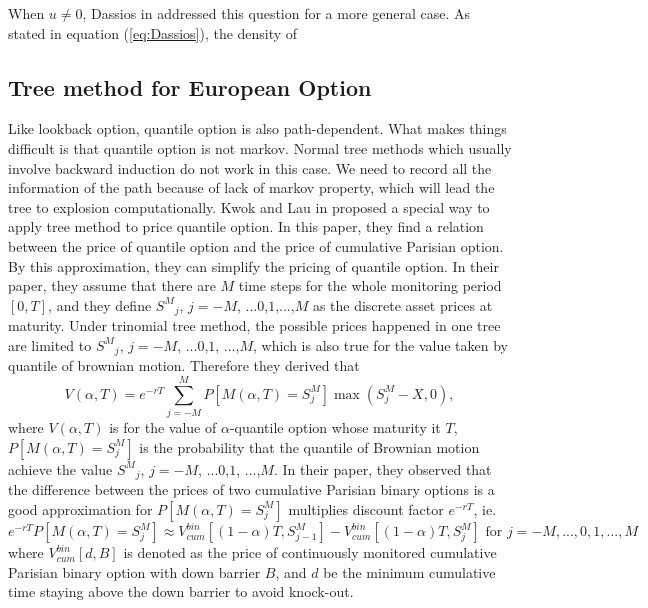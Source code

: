 \documentclass[11pt]{book}
\begin{document}
When $u \neq 0$, Dassios  in \cite{Dassios1995} addressed this question for a more general case.  As stated in equation (\ref{eq:Dassios}), the density of 


\subsection{Tree method for European Option}
Like lookback option, quantile option is also path-dependent. What makes things difficult is that quantile option is not markov. Normal tree methods which usually involve backward induction do not work in this case. We need to record all the information of the path because of lack of markov property, which will lead the tree to explosion computationally. 
Kwok and Lau in \cite{Kwok2001} proposed a special way to apply tree method to price quantile option. In this paper, they find a relation between the price of quantile option and the price of cumulative Parisian option. By this approximation, they can simplify the pricing of quantile option. In their paper, they assume that there are $M$ time steps for the whole monitoring period $[0,T]$, and they define ${S^M}_j$, $j = - M$, ...$0$,$1$,...,$M$ as the discrete asset prices at maturity. Under trinomial tree method, the possible prices happened in one tree are limited to ${S^M}_j$,  $j = - M$, ...$0$,$1$, ...,$M$, which is also true for the value taken by quantile of brownian motion. Therefore they derived that 
\begin{equation}\label{eq:kowk1}
V(\alpha, T) = e^{-rT} \sum^{M}_{j=-M}P[M(\alpha,T)=S^{M}_{j}]\max(S^{M}_{j}-X,0),
\end{equation}
where $V(\alpha,T)$ is for the value of $\alpha$-quantile option whose maturity it $T$, $P[M(\alpha,T)=S^{M}_{j}]$ is the probability that the quantile of Brownian motion achieve the value ${S^M}_j$,  $j = - M$, ...$0$,$1$, ...,$M$. In their paper, they observed that the difference between the prices of two cumulative Parisian binary options is a good approximation for $P[M(\alpha,T)=S^{M}_{j}]$ multiplies discount factor $e^{-rT}$, ie.
\begin{equation}\label{eq:kowk2}
e^{-rT}P[M(\alpha,T)=S^{M}_{j}] \approx V^{bin}_{cum}[(1-\alpha)T, S^{M}_{j-1}]-V_{cum}^{bin}[(1-\alpha)T, S_{j}^{M}]  
\text{ for }j=-M, ... , 0, 1, ... , M
\end{equation}
where $V^{bin}_{cum}[d,B]$ is denoted as the price of continuously monitored cumulative Parisian binary option with down barrier $B$, and $d$ be the minimum cumulative time staying above the down barrier to avoid knock-out. 
\end{document}

